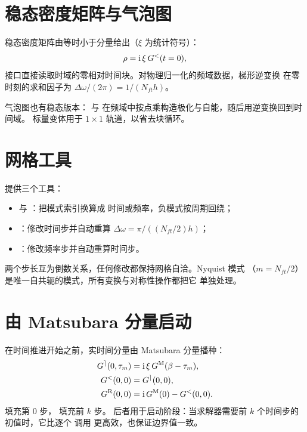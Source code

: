 \section{稳态密度矩阵与气泡图}
\label{sec:steady-obs}

稳态密度矩阵由等时小于分量给出（$\xi$ 为统计符号）：
\begin{equation}
    \rho = \mathrm{i}\,\xi\,G^{<}(t=0),
\end{equation}
接口直接读取时域的零相对时间块。对物理归一化的频域数据，梯形逆变换
在零时刻的求和因子为 $\Delta\omega/(2\pi)=1/(N_{ft}h)$。

气泡图也有稳态版本：
 与 
在频域中按点乘构造极化与自能，随后用逆变换回到时间域。
标量变体用于 $1\times1$ 轨道，以省去块循环。

\section{网格工具}
\label{sec:grid-tools}

 提供三个工具：
\begin{itemize}
    \item {} 与 ：把模式索引换算成
          时间或频率，负模式按周期回绕；
    \item {}：修改时间步并自动重算
          $\Delta\omega=\pi/((N_{ft}/2)h)$；
    \item {}：修改频率步并自动重算时间步。
\end{itemize}
两个步长互为倒数关系，任何修改都保持网格自洽。Nyquist 模式
（$m=N_{ft}/2$）是唯一自共轭的模式，所有变换与对称性操作都把它
单独处理。

\section{由 Matsubara 分量启动}
\label{sec:from-mat}

在时间推进开始之前，实时间分量由 Matsubara 分量播种：
\begin{align}
    G^{\rceil}(0,\tau_m) &= \mathrm{i}\,\xi\,G^{\mathrm{M}}(\beta-\tau_m),\\
    G^{<}(0,0) &= G^{\rceil}(0,0),\\
    G^{\mathrm{R}}(0,0) &= \mathrm{i}\,G^{\mathrm{M}}(0)-G^{<}(0,0).
\end{align}
 填充第 $0$ 步， 填充前 $k$ 步。
后者用于启动阶段：当求解器需要前 $k$ 个时间步的初值时，它比逐个
调用  更高效，也保证边界值一致。
